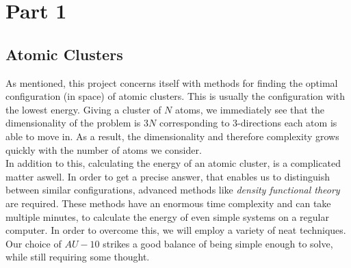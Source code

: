 \documentclass[working, oneside]{../../../Preambles/marginclass}
\begin{document}
\let\cleardoublepage\clearpage
\thispagestyle{fancy}


\chapter{Part 1}
\section{Atomic Clusters}
As mentioned, this project concerns itself with methods for finding the optimal configuration (in space) of atomic clusters. This is usually the configuration with the lowest energy. Giving a cluster of $N$ atoms, we immediately see that the dimensionality of the problem is $3N$ corresponding to $3$-directions each atom is able to move in. As a result, the dimensionality and therefore complexity grows quickly with the number of atoms we consider. 
\\
In addition to this, calculating the energy of an atomic cluster, is a complicated matter aswell. In order to get a precise answer, that enables us to distinguish between similar configurations, advanced methods like \textit{density functional theory} are required. These methods have an enormous time complexity and can take multiple minutes, to calculate the energy of even simple systems on a regular computer. In order to overcome this, we will employ a variety of neat techniques. \\
Our choice of $AU-10$ strikes a good balance of being simple enough to solve, while still requiring some thought.
\end{document}
